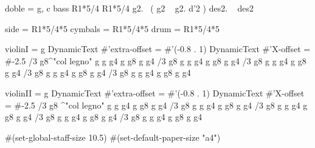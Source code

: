doble = \relative  g, {
  \key c \major
  \clef bass
  R1*5/4 R1*5/4
  g2.\p ~ ( g2 ~ g2. \< d'2 \! ) des2. \> ~ des2 \! \laissezVibrer %
}

side  = { R1*5/4*5 }
cymbals  = { R1*5/4*5 }
drum  = { R1*5/4*5 }

violinI = \relative g {
  \once \override DynamicText #'extra-offset = #'(-0.8 . 1)
  \once \override DynamicText #'X-offset = #-2.5
  /3 { g8\p ^"col legno" g g }  g4 g g8 g g4
  /3 { g8 g g } g4 g g8 g g4
  /3 { g8 g g } g4 g g8 g g4
  /3 { g8 \< g g } g4 g g8 g g4\!
  /3 { g8 \> g g } g4 g g8 g g4\! }

violinII = \relative g {
  \once \override DynamicText #'extra-offset = #'(-0.8 . 1)
  \once \override DynamicText #'X-offset = #-2.5
  /3 { g8 \p ^"col legno" g g }  g4 g g8 g g4
  /3 { g8 g g } g4 g g8 g g4
  /3 { g8 g g } g4 g g8 g g4
  /3 { g8 \< g g } g4 g g8 g g4\!
  /3 { g8 \> g g } g4 g g8 g g4\! }


#(set-global-staff-size 10.5)  %
#(set-default-paper-size "a4") %




